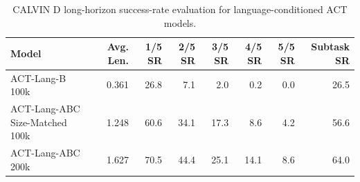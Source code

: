 \begin{table}[t]
\centering
\caption{CALVIN D long-horizon success-rate evaluation for language-conditioned ACT models.}
\label{tab:task3-success-rate-d}
\begin{tabular}{lrrrrrrr}
\toprule
Model & Avg. Len. & 1/5 SR & 2/5 SR & 3/5 SR & 4/5 SR & 5/5 SR & Subtask SR \\
\midrule
ACT-Lang-B 100k & 0.361 & 26.8 & 7.1 & 2.0 & 0.2 & 0.0 & 26.5 \\
ACT-Lang-ABC Size-Matched 100k & 1.248 & 60.6 & 34.1 & 17.3 & 8.6 & 4.2 & 56.6 \\
ACT-Lang-ABC 200k & 1.627 & 70.5 & 44.4 & 25.1 & 14.1 & 8.6 & 64.0 \\
\bottomrule
\end{tabular}
\end{table}
